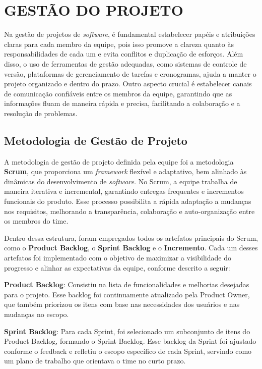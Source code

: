 \chapter{GESTÃO DO PROJETO}
\label{requisitos-aplicacoes}

Na gestão de projetos de \textit{software}, é fundamental estabelecer papéis e atribuições claras para cada membro da equipe, pois isso promove a clareza quanto às responsabilidades de cada um e evita conflitos e duplicação de esforços. Além disso, o uso de ferramentas de gestão adequadas, como sistemas de controle de versão, plataformas de gerenciamento de tarefas e cronogramas, ajuda a manter o projeto organizado e dentro do prazo. Outro aspecto crucial é estabelecer canais de comunicação confiáveis entre os membros da equipe, garantindo que as informações fluam de maneira rápida e precisa, facilitando a colaboração e a resolução de problemas. 


\section{Metodologia de Gestão de Projeto}

A metodologia de gestão de projeto definida pela equipe foi a metodologia \textbf{Scrum}, que proporciona um \textit{framework} flexível e adaptativo, bem alinhado às dinâmicas do desenvolvimento de \textit{software}. No Scrum, a equipe trabalha de maneira iterativa e incremental, garantindo entregas frequentes e incrementos funcionais do produto. Esse processo possibilita a rápida adaptação a mudanças nos requisitos, melhorando a transparência, colaboração e auto-organização entre os membros do time.

Dentro dessa estrutura, foram empregados todos os artefatos principais do Scrum, como o \textbf{Product Backlog}, o \textbf{Sprint Backlog} e o \textbf{Incremento}. Cada um desses artefatos foi implementado com o objetivo de maximizar a visibilidade do progresso e alinhar as expectativas da equipe, conforme descrito a seguir:

\textbf{Product Backlog}: Consistiu na lista de funcionalidades e melhorias desejadas para o projeto. Esse backlog foi continuamente atualizado pela Product Owner, que também priorizou os itens com base nas necessidades dos usuários e nas mudanças no escopo.

\textbf{Sprint Backlog}: Para cada Sprint, foi selecionado um subconjunto de itens do Product Backlog, formando o Sprint Backlog. Esse backlog da Sprint foi ajustado conforme o feedback e refletiu o escopo específico de cada Sprint, servindo como um plano de trabalho que orientava o time no curto prazo.

